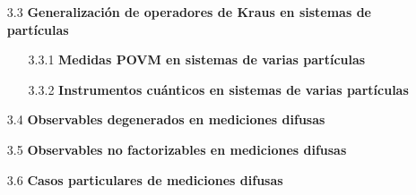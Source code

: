 \documentclass[12pt,oneside]{book}\raggedbottom{} %
\begin{document}
\begin{sloppypar}
{{\begin{itemize}
\begin{itemize}
    \item[3.2.2] \textbf{Instrumentos cuánticos para dos partículas}
\item[3.2.3]\textbf{{Equivalencia de los instrumentos}}
\item[3.2.4] \textbf{Ejemplos sobre los efectos de una medición difusa:}
  \end{itemize}

 
  \item[3.3 ] \textbf{Generalización de operadores de Kraus en sistemas de \texorpdfstring{}{N} partículas}

\begin{itemize}
  \item[3.3.1] \textbf{Medidas POVM en sistemas de varias partículas}
  \item[3.3.2] \textbf{Instrumentos cuánticos en sistemas de varias partículas} 
\end{itemize}

\item[3.4]\textbf{Observables degenerados en mediciones difusas} 

\item[3.5] \textbf{Observables no factorizables en mediciones difusas} %

\item[3.6] \textbf{Casos particulares de mediciones difusas} 




\end{itemize}}}
\end{sloppypar}
\end{document}
